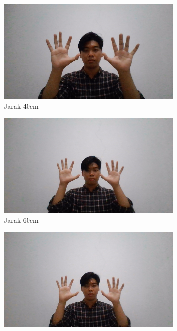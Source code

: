\begin{figure}[H]
  \centering
  \begin{subfigure}{0.4\textwidth}
    \centering
    \includegraphics[width=\linewidth]{../Gambar/40cm.jpg}
    \caption{Jarak 40cm}
    \label{fig:jarak40cm}
  \end{subfigure}
  \begin{subfigure}{0.4\textwidth}
    \centering
    \includegraphics[width=\linewidth]{../Gambar/60cm.jpg}
    \caption{Jarak 60cm}
    \label{fig:jarak60cm}
  \end{subfigure}
  \begin{subfigure}{0.4\textwidth}
    \centering
    \includegraphics[width=\linewidth]{../Gambar/80cm.jpg}

\end{subfigure}
\end{figure}
